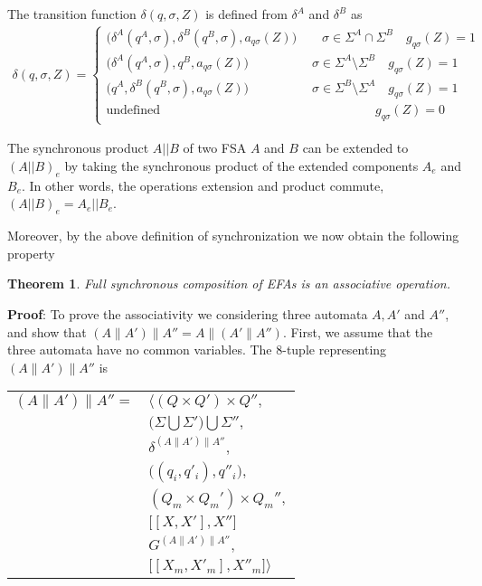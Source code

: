 \documentclass{article}
\newtheorem{theorem}{Theorem}
\begin{document}
 The transition function
$\delta(q,\sigma,Z)$ is defined from $\delta^A$ and $\delta^B$ as
\begin{eqnarray}
\delta(q,\sigma,Z)=\left\{
\begin{array}{ll}
\big(\delta^A(q^A,\sigma),\delta^B(q^B,\sigma),a_{q \sigma}(Z)\big) \quad\quad \sigma\in \Sigma^A \cap \Sigma^B \quad g_{q \sigma}(Z)=1\\
\big(\delta^A(q^A,\sigma),q^B,a_{q \sigma}(Z)\big) \quad\quad\quad\quad\quad \sigma\in \Sigma^A \setminus \Sigma^B \quad g_{q \sigma}(Z)=1\\
\big(q^A,\delta^B(q^B,\sigma),a_{q \sigma}(Z)\big) \quad\quad\quad\quad\quad \sigma\in \Sigma^B \setminus \Sigma^A \quad g_{q \sigma}(Z)=1\\
\textrm{
undefined}\quad\quad\quad\quad\quad\quad\quad\quad\quad\quad\quad\quad\quad\quad\quad\quad\quad
g_{q\sigma}(Z)=0
\end{array}\right.
\end{eqnarray}

The synchronous product $A||B$ of two FSA $A$ and $B$ can be
extended to $(A||B)_e$ by taking the synchronous product of the
extended components  $A_e$ and $B_e$. In other words, the
operations extension and product commute, $(A||B)_e=A_e||B_e$.

Moreover, by the above definition of synchronization we now obtain
the following property

\begin{theorem}
   Full synchronous composition of EFAs is an associative
   operation.
\end{theorem}

\noindent \textbf{Proof}: To prove the associativity we
considering three automata $A, A'$ and $A''$, and show that
$(A\|A')\|A'' = A\|(A'\|A'')$. First, we assume that the three
automata have no common variables.
\newline\newline
\noindent The 8-tuple representing $(A\|A')\|A''$ is
\begin{center}
\begin{tabular}{ll}
  $(A\|A')\|A'' =$ & $\Big \langle (Q \times Q') \times Q'',$\\
  & $ \big(\Sigma \bigcup \Sigma' \big) \bigcup \Sigma'',$\\
  & $\delta^{(A\|A')\|A''},$\\
  & $\big((q_i, q'_i) , q''_i\big),$\\
  & $(Q_m \times Q_m') \times Q_m'',$\\
  & $\big[[X, X'], X'']$\\
  & $G^{(A\|A')\|A''},$\\
  & $\big[[X_m, X'_m], X''_m \big] \Big \rangle$
\end{tabular}
\end{center}
\end{document}
